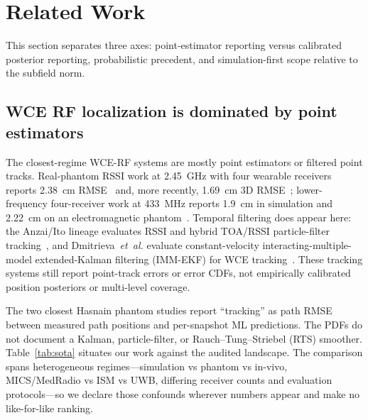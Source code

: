 \section{Related Work}\label{sec:related}

This section separates three axes: point-estimator reporting versus calibrated
posterior reporting, probabilistic precedent, and simulation-first scope relative
to the subfield norm.

\subsection{WCE RF localization is dominated by point estimators}
The closest-regime WCE-RF systems are mostly point estimators or filtered point
tracks. Real-phantom RSSI work at \SI{2.45}{GHz} with four wearable receivers
reports \SI{2.38}{cm} RMSE~\cite{hasnain2024} and, more recently,
\SI{1.69}{cm} 3D RMSE~\cite{hasnain2026}; lower-frequency four-receiver work at
\SI{433}{MHz} reports \SI{1.9}{cm} in simulation and \SI{2.22}{cm} on an
electromagnetic phantom~\cite{yoshitake2022}. Temporal filtering does appear
here: the Anzai/Ito lineage evaluates RSSI and hybrid TOA/RSSI particle-filter
tracking~\cite{anzai2012,ito2013,ito2014,ito2016}, and
Dmitrieva~\textit{et~al.} evaluate constant-velocity
interacting-multiple-model extended-Kalman filtering (IMM-EKF) for WCE
tracking~\cite{dmitrieva2021}. These tracking systems still report point-track
errors or error CDFs, not empirically calibrated position posteriors or
multi-level coverage.

The two closest Hasnain phantom studies report ``tracking'' as path RMSE between
measured path positions and per-snapshot ML predictions. The PDFs do not document
a Kalman, particle-filter, or Rauch--Tung--Striebel (RTS) smoother.
Table~\ref{tab:sota} situates our work against the audited landscape. The
comparison spans heterogeneous regimes---simulation vs phantom vs in-vivo,
MICS/MedRadio vs ISM vs UWB, differing receiver counts and evaluation
protocols---so we declare those confounds wherever numbers appear and make no
like-for-like ranking.

